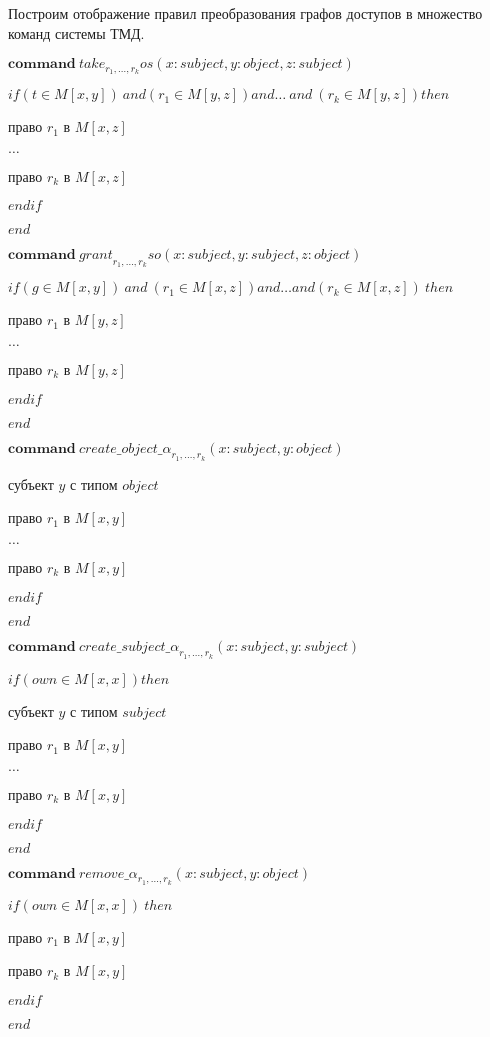 	Построим отображение правил преобразования графов доступов в множество команд системы ТМД.
\begin{multicols}{2}
	\begin{itemize*}
		\item 	$\mathbf{command} \ \mathit{take}_{r_1, \ldots, r_k}os(x: subject,y:object,z:subject)$

			$if (t \in M[x,y]) \ and (r_1 \in M[y,z])and  \ldots \ and \ (r_k \in M[y,z]) then $

			 право $r_1$ в $M[x,z]$

			$\ldots$

			 право $r_k$ в $M[x,z]$

			$endif$

			$end$

			\item $\mathbf{command} \  \mathit{grant}_{r_1, \ldots, r_k}so(x: subject,y:subject,z:object)$

			$if (g \in M[x,y]) \ and  \ (r_1 \in M[x,z]) and  \ldots and (r_k \in M[x,z]) \ then $

			 право $r_1$ в $M[y,z]$

			$\ldots$

			 право $r_k$ в $M[y,z]$

			$endif$

			$end$
	\end{itemize*}

	\begin{itemize*}
		\item 		$\mathbf{command} \  \mathit{create\_object\_\alpha}_{r_1, \ldots, r_k}(x: subject,y:object)$


				 субъект $y$ с типом $object$

				 право $r_1$ в $M[x,y]$

				$\ldots$

				 право $r_k$ в $M[x,y]$

				$endif$

				$end$
				\item		$\mathbf{command} \ \mathit{create\_subject\_\alpha}_{r_1, \ldots, r_k}(x: subject,y:subject)$

						$if (own \in M[x,x]) then $

						 субъект $y$ с типом $subject$

						 право $r_1$ в $M[x,y]$

						$\ldots$

						 право $r_k$ в $M[x,y]$

						$endif$

						$end$
	\end{itemize*}
\end{multicols}


		$\mathbf{command} \ \mathit{remove\_\alpha}_{r_1, \ldots, r_k}(x: subject,y:object)$

		$if (own \in M[x,x]) \ then $

		 право $r_1$ в $M[x,y]$

		 право $r_k$ в $M[x,y]$

		$endif$

		$end$
\newpage

